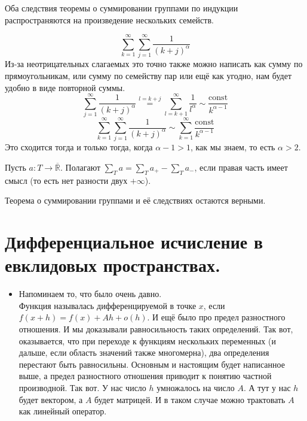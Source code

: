 \documentclass{article}
\begin{document}
\begin{itemize}
\begin{Comment}
            Оба следствия теоремы о суммировании группами по индукции распространяются на произведение нескольких семейств.
        \end{Comment}
        \begin{Example}
            $$\sum\limits_{k=1}^\infty\sum\limits_{j=1}^\infty\frac1{(k+j)^\alpha}$$
            Из-за неотрицательных слагаемых это точно также можно написать как сумму по прямоугольникам, или сумму по семейству пар или ещё как угодно, нам будет удобно в виде повторной суммы.
            $$
            \sum\limits_{j=1}^\infty\frac1{(k+j)^\alpha}\overset{l=k+j}=\sum\limits_{l=k+1}^\infty\frac1{l^\alpha}\sim\frac{\mathrm{const}}{k^{\alpha-1}}
            $$
            $$
            \sum\limits_{k=1}^\infty\sum\limits_{j=1}^\infty\frac1{(k+j)^\alpha}\sim\sum\limits_{k=1}^\infty\frac{\mathrm{const}}{k^{\alpha-1}}
            $$
            Это сходится тогда и только тогда, когда $\alpha-1>1$, как мы знаем, то есть $\alpha>2$.
        \end{Example}
        \dfn Пусть $a\colon T\to\overline{\mathbb R}$. Полагают $\sum\limits_T a=\sum\limits_T a_+-\sum\limits_T a_-$, если правая часть имеет смысл (то есть нет разности двух $+\infty$).
        \begin{Comment}
            Теорема о суммировании группами и её следствиях остаются верными.
        \end{Comment}
    \end{itemize}
    \section{Дифференциальное исчисление в евклидовых пространствах.}
    \begin{itemize}
        \item[]
        \begin{Comment}
            Напоминаем то, что было очень давно.\\
            Функция называлась дифференцируемой в точке $x$, если $f(x+h)=f(x)+Ah+o(h)$. И ещё было про предел разностного отношения. И мы доказывали равносильность таких определений. Так вот, оказывается, что при переходе к функциям нескольких переменных (и дальше, если область значений также многомерна), два определения перестают быть равносильны. Основным и настоящим будет написанное выше, а предел разностного отношения приводит к понятию частной производной. Так вот. У нас число $h$ умножалось на число $A$. А тут у нас $h$ будет вектором, а $A$ будет матрицей. И в таком случае можно трактовать $A$ как линейный оператор.
        \end{Comment}
    \end{itemize}
\end{document}
